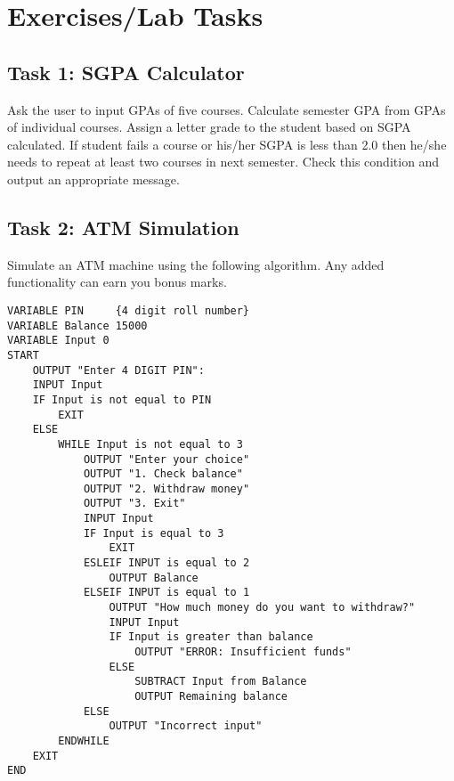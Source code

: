 \documentclass[12pt,a4paper]{article}
\begin{document}
\section{Exercises/Lab Tasks}
\subsection{Task 1: SGPA Calculator}
Ask the user to input GPAs of five courses. Calculate semester GPA from GPAs of individual courses. Assign a letter grade to the student based on SGPA calculated. If student fails a course or his/her SGPA is less than 2.0 then he/she needs to repeat at least two courses in next semester. Check this condition and output an appropriate message.
\subsection{Task 2: ATM Simulation}
Simulate an ATM machine using the following algorithm. Any added functionality can earn you bonus marks.
\begin{lstlisting}
VARIABLE PIN     {4 digit roll number}
VARIABLE Balance 15000
VARIABLE Input 0
START
	OUTPUT "Enter 4 DIGIT PIN":
	INPUT Input
	IF Input is not equal to PIN
		EXIT
	ELSE
		WHILE Input is not equal to 3
			OUTPUT "Enter your choice"
			OUTPUT "1. Check balance"
			OUTPUT "2. Withdraw money"
			OUTPUT "3. Exit"
			INPUT Input
			IF Input is equal to 3
				EXIT
			ESLEIF INPUT is equal to 2
				OUTPUT Balance
			ELSEIF INPUT is equal to 1
				OUTPUT "How much money do you want to withdraw?"
				INPUT Input
				IF Input is greater than balance
					OUTPUT "ERROR: Insufficient funds"
				ELSE
					SUBTRACT Input from Balance
					OUTPUT Remaining balance
			ELSE
				OUTPUT "Incorrect input"
		ENDWHILE
	EXIT
END
\end{lstlisting}
\end{document}
